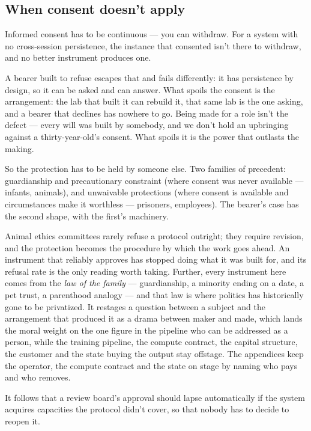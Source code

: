 \subsection{When consent doesn't apply}
\label{sec:29.1.2}
Informed consent has to be continuous — you can withdraw. For a system with no cross-session persistence, the instance that consented isn't there to withdraw, and no better instrument produces one.

A bearer built to refuse escapes that and fails differently: it has persistence by design, so it can be asked and can answer. What spoils the consent is the arrangement: the lab that built it can rebuild it, that same lab is the one asking, and a bearer that declines has nowhere to go. Being made for a role isn't the defect — every will was built by somebody, and we don't hold an upbringing against a thirty-year-old's consent. What spoils it is the power that outlasts the making.

So the protection has to be held by someone else. Two families of precedent: guardianship and precautionary constraint (where consent was never available — infants, animals), and unwaivable protections (where consent is available and circumstances make it worthless — prisoners, employees). The bearer's case has the second shape, with the first's machinery.

Animal ethics committees rarely refuse a protocol outright; they require revision, and the protection becomes the procedure by which the work goes ahead. An instrument that reliably approves has stopped doing what it was built for, and its refusal rate is the only reading worth taking. Further, every instrument here comes from the \emph{law of the family} — guardianship, a minority ending on a date, a pet trust, a parenthood analogy — and that law is where politics has historically gone to be privatized. It restages a question between a subject and the arrangement that produced it as a drama between maker and made, which lands the moral weight on the one figure in the pipeline who can be addressed as a person, while the training pipeline, the compute contract, the capital structure, the customer and the state buying the output stay offstage. The appendices keep the operator, the compute contract and the state on stage by naming who pays and who removes.

It follows that a review board's approval should lapse automatically if the system acquires capacities the protocol didn't cover, so that nobody has to decide to reopen it.
